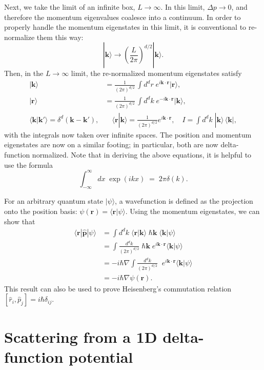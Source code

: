 \documentclass[pra,12pt]{revtex4}
\begin{document}
Next, we take the limit of an infinite box, $L \rightarrow \infty$.
In this limit, $\Delta p \rightarrow 0$, and therefore the momentum
eigenvalues coalesce into a continuum.  In order to properly handle
the momentum eigenstates in this limit, it is conventional to
re-normalize them this way:
$$|\mathbf{k}\rangle \rightarrow \left(\frac{L}{2\pi}\right)^{d/2} |\mathbf{k}\rangle.$$
Then, in the $L\rightarrow\infty$ limit, the re-normalized momentum
eigenstates satisfy
$$\boxed{\begin{aligned} |\mathbf{k}\rangle &= \frac{1}{(2\pi)^{d/2}} \, \int d^dr \; e^{i\mathbf{k}\cdot\mathbf{r}} |\mathbf{r}\rangle, \\ |\mathbf{r}\rangle &= \frac{1}{(2\pi)^{d/2}} \, \int d^dk \; e^{-i\mathbf{k}\cdot\mathbf{r}} |\mathbf{k}\rangle, \\\langle\mathbf{k}|\mathbf{k}'\rangle = \delta^d(\mathbf{k}-\mathbf{k}'),& \quad \langle\mathbf{r}|\mathbf{k}\rangle = \frac{1}{(2\pi)^{d/2}} e^{i\mathbf{k}\cdot\mathbf{r}}, \quad I = \int d^dk \;|\mathbf{k}\rangle\,\langle\mathbf{k}|,\end{aligned}}$$
with the integrals now taken over infinite spaces.  The position and
momentum eigenstates are now on a similar footing; in particular, both
are now delta-function normalized.  Note that in deriving the above
equations, it is helpful to use the formula
$$\int_{-\infty}^\infty dx\; \exp(ikx) \;=\; 2\pi\delta(k).$$

For an arbitrary quantum state $|\psi\rangle$, a wavefunction is
defined as the projection onto the position basis: $\psi(\mathbf{r}) =
\langle \mathbf{r}|\psi\rangle$.  Using the momentum eigenstates, we can
show that
$$\begin{aligned}\langle \mathbf{r}|\hat{\mathbf{p}}|\psi\rangle &=  \int d^dk \; \langle\mathbf{r}|\mathbf{k}\rangle \; \hbar\mathbf{k} \; \langle\mathbf{k}|\psi\rangle \\ &=  \int \frac{d^dk}{(2\pi)^{d/2}}\; \hbar\mathbf{k} \;e^{i\mathbf{k}\cdot\mathbf{r}} \langle\mathbf{k}|\psi\rangle \\ &=  -i\hbar\nabla \int \frac{d^dk}{(2\pi)^{d/2}}\; \;e^{i\mathbf{k}\cdot\mathbf{r}} \langle\mathbf{k}|\psi\rangle \\ &= -i\hbar \nabla\psi(\mathbf{r}).\end{aligned}$$
This result can also be used to prove Heisenberg's commutation relation
$[\hat{r}_i, \hat{p}_j] = i\hbar\delta_{ij}$.

\section{Scattering from a 1D delta-function potential}
\label{sec:1dscatter}
\end{document}
